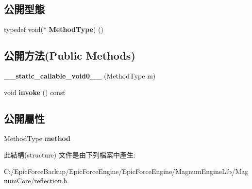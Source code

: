 \subsection*{公開型態}
\begin{DoxyCompactItemize}
\item 
typedef void($\ast$ {\bfseries Method\+Type}) ()\hypertarget{structagm_1_1reflection_1_1____static__callable__void0_____a4d6f6bcc9763c332b1b9d6c19cce9ddc}{}\label{structagm_1_1reflection_1_1____static__callable__void0_____a4d6f6bcc9763c332b1b9d6c19cce9ddc}

\end{DoxyCompactItemize}
\subsection*{公開方法(Public Methods)}
\begin{DoxyCompactItemize}
\item 
{\bfseries \+\_\+\+\_\+static\+\_\+callable\+\_\+void0\+\_\+\+\_\+} (Method\+Type m)\hypertarget{structagm_1_1reflection_1_1____static__callable__void0_____a0353db4bbab34ec53402da5e751ebadd}{}\label{structagm_1_1reflection_1_1____static__callable__void0_____a0353db4bbab34ec53402da5e751ebadd}

\item 
void {\bfseries invoke} () const \hypertarget{structagm_1_1reflection_1_1____static__callable__void0_____a167548500b53625d236b181c4bddfbdb}{}\label{structagm_1_1reflection_1_1____static__callable__void0_____a167548500b53625d236b181c4bddfbdb}

\end{DoxyCompactItemize}
\subsection*{公開屬性}
\begin{DoxyCompactItemize}
\item 
Method\+Type {\bfseries method}\hypertarget{structagm_1_1reflection_1_1____static__callable__void0_____a0b52ba67353b42ef2096c5ec91a1e67c}{}\label{structagm_1_1reflection_1_1____static__callable__void0_____a0b52ba67353b42ef2096c5ec91a1e67c}

\end{DoxyCompactItemize}


此結構(structure) 文件是由下列檔案中產生\+:\begin{DoxyCompactItemize}
\item 
C\+:/\+Epic\+Force\+Backup/\+Epic\+Force\+Engine/\+Epic\+Force\+Engine/\+Magnum\+Engine\+Lib/\+Magnum\+Core/reflection.\+h\end{DoxyCompactItemize}
